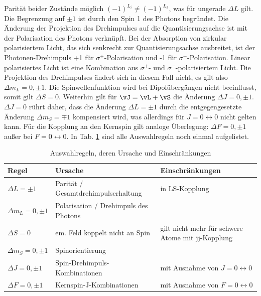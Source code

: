 Parität beider Zustände möglich $(-1)^{L_i}\neq(-1)^{L_k}$, was für ungerade
$\Delta L$ gilt. Die Begrenzung auf $\pm1$ ist durch den Spin 1 des Photons
begründet. Die Änderung der Projektion des Drehimpulses auf die
Quantisierungsachse ist mit der Polarisation des Photons verknüpft. Bei der
Absorption von zirkular polarisiertem Licht, das sich senkrecht zur
Quantisierungsachse ausbreitet, ist der Photonen-Drehimpuls +1 für
$\sigma^+$-Polarisation und -1 für $\sigma^-$-Polarisation. Linear polarisiertes
Licht ist eine Kombination aus $\sigma^+$- und $\sigma^-$-polarisiertem Licht.
Die Projektion des Drehimpulses ändert sich in diesem Fall nicht, es gilt also
$\Delta m_L = 0, \pm1$. Die Spinwellenfunktion wird bei Dipolübergängen nicht
beeinflusst, somit gilt $\Delta S=0$. Weiterhin gilt für $\vJ=\vL+\vS$ die
Änderung $\Delta J=0,\pm1$. $\Delta J=0$ rührt daher, dass die Änderung $\Delta
L=\pm1$ durch die entgegengesetzte Änderung $\Delta m_S=\mp1$ kompensiert wird,
was allerdings für $J=0\leftrightarrow0$ nicht gelten kann. Für die Kopplung an
den Kernspin gilt analoge Überlegung: $\Delta F = 0, \pm1$ außer bei
$F=0\leftrightarrow0$. In Tab. \ref{tab:auswahlregeln} sind alle
Auswahlregeln noch einmal aufgelistet.

\begin{table}
	\begin{tabular}{p{}p{}p{}}
		\toprule
		Regel & Ursache & Einschränkungen \\
		\midrule[1px]
		\hline
		$\Delta L = \pm1$ & Parität / Gesamtdrehimpulserhaltung & in LS-Kopplung \\
		$\Delta m_L = 0, \pm1$ & Polarisation / Drehimpuls des Photons & \\
		$\Delta S = 0$ & em. Feld koppelt nicht an Spin & gilt nicht mehr für schwere
		Atome mit jj-Kopplung \\
		$\Delta m_S = 0, \pm1$ & Spinorientierung & \\
		$\Delta J = 0, \pm1$ & Spin-Drehimpuls-Kombinationen & mit Ausnahme von
		$J=0\leftrightarrow0$
		\\
		$\Delta F = 0, \pm1$ & Kernspin-J-Kombinationen & mit Ausnahme von
		$F=0\leftrightarrow0$
		\\
		\bottomrule[1px]
	\end{tabular}
	\caption[Auswahlregeln]{Auswahlregeln, deren Ursache und Einschränkungen}
	\label{tab:auswahlregeln}
\end{table}



